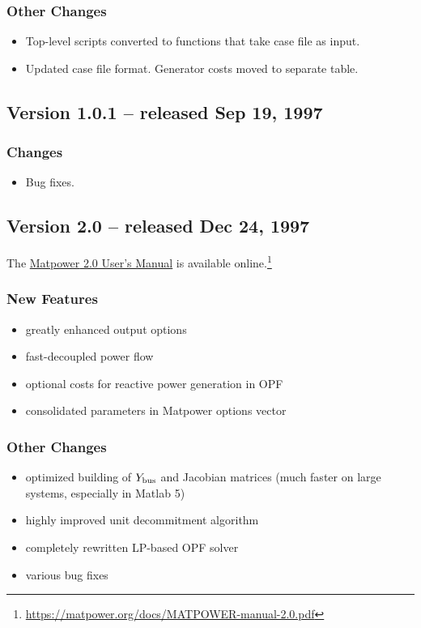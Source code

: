 \documentclass[12pt]{article}
\newcommand{\matlab}[0]{{\sc Matlab}}
\newcommand{\matpower}[0]{{\sc Matpower}}
\newcommand{\code}[1]{{\relsize{-0.5}{\tt{{#1}}}}}  %
\newcommand{\gencost}[0]{\code{gencost}}
\numberwithin{equation}{section}
\numberwithin{table}{section}
\numberwithin{figure}{section}
\begin{document}
\begin{appendices}
\subsubsection*{Other Changes}
\begin{itemize}
\item Top-level scripts converted to functions that take case file as input.
\item Updated case file format. Generator costs moved to separate \gencost{} table.
\end{itemize}

\subsection{Version 1.0.1 -- released Sep 19, 1997}
\label{app:v101}

\subsubsection*{Changes}
\begin{itemize}
\item Bug fixes.
\end{itemize}

\pagebreak
\subsection{Version 2.0 -- released Dec 24, 1997}
\label{app:v20}

The \href{https://matpower.org/docs/MATPOWER-manual-2.0.pdf}{\matpower{} 2.0 User's Manual} is available online.\footnote{\url{https://matpower.org/docs/MATPOWER-manual-2.0.pdf}}

\subsubsection*{New Features}
\begin{itemize}
\item greatly enhanced output options
\item fast-decoupled power flow
\item optional costs for reactive power generation in OPF
\item consolidated parameters in \matpower{} options vector
\end{itemize}

\subsubsection*{Other Changes}
\begin{itemize}
\item optimized building of $Y_{\rm bus}$ and Jacobian matrices (much faster on large systems, especially in \matlab{} 5)
\item highly improved unit decommitment algorithm
\item completely rewritten LP-based OPF solver
\item various bug fixes
\end{itemize}


\end{appendices}
\end{document}
